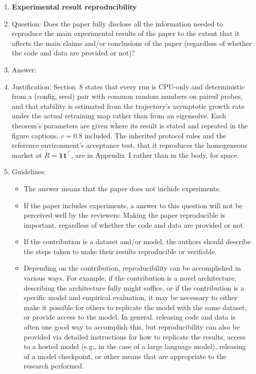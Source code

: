 \begin{enumerate}
    \item {\bf Experimental result reproducibility}
    \item[] Question: Does the paper fully disclose all the information needed to reproduce the main experimental results of the paper to the extent that it affects the main claims and/or conclusions of the paper (regardless of whether the code and data are provided or not)?
    \item[] Answer: \answerYes{}
    \item[] Justification: Section~8 states that every run is CPU-only and deterministic from a (config, seed) pair with common random numbers on paired probes, and that stability is estimated from the trajectory's asymptotic growth rate under the actual retraining map rather than from an eigensolve. Each theorem's parameters are given where its result is stated and repeated in the figure captions, $c=0.8$ included. The inherited protocol rules and the reference environment's acceptance test, that it reproduces the homogeneous market at $R=\mathbf{1}\mathbf{1}^{\top}$, are in Appendix~I rather than in the body, for space.
    \item[] Guidelines:
    \begin{itemize}
        \item The answer \answerNA{} means that the paper does not include experiments.
        \item If the paper includes experiments, a \answerNo{} answer to this question will not be perceived well by the reviewers: Making the paper reproducible is important, regardless of whether the code and data are provided or not.
        \item If the contribution is a dataset and\slash or model, the authors should describe the steps taken to make their results reproducible or verifiable. 
        \item Depending on the contribution, reproducibility can be accomplished in various ways. For example, if the contribution is a novel architecture, describing the architecture fully might suffice, or if the contribution is a specific model and empirical evaluation, it may be necessary to either make it possible for others to replicate the model with the same dataset, or provide access to the model. In general. releasing code and data is often one good way to accomplish this, but reproducibility can also be provided via detailed instructions for how to replicate the results, access to a hosted model (e.g., in the case of a large language model), releasing of a model checkpoint, or other means that are appropriate to the research performed.

\end{itemize}
\end{enumerate}
